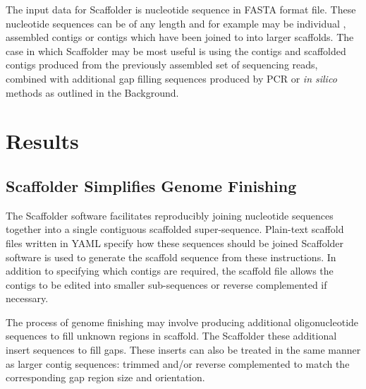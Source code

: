 \documentclass[10pt]{bmc_article}
\newenvironment{bmcformat}{\begin{raggedright}\baselineskip20pt\sloppy\setboolean{publ}{false}}{\end{raggedright}\baselineskip20pt\sloppy}
\begin{document}
\begin{bmcformat}
The input data for Scaffolder is nucleotide sequence in FASTA format file.
These nucleotide sequences can be of any length and for example may be
individual , assembled contigs or contigs which have
been joined to into larger scaffolds. The case in which Scaffolder may be most
useful is using the contigs and scaffolded contigs produced from the
previously assembled set of sequencing reads, combined with additional gap
filling sequences produced by PCR or \emph{in silico} methods as outlined in
the Background. \pb


\clearpage

\section*{Results} %

\subsection*{Scaffolder Simplifies Genome Finishing} %

The Scaffolder software facilitates reproducibly joining nucleotide sequences
together into a single contiguous scaffolded super-sequence. Plain-text
scaffold files written in  YAML  specify how these
sequences should be joined Scaffolder software is used
to generate the scaffold sequence from these instructions. In addition to
specifying which contigs are required, the scaffold file allows the contigs to
be edited into smaller sub-sequences or reverse complemented if necessary.
 \pb

The process of genome finishing may involve producing additional
oligonucleotide sequences to fill unknown regions in  scaffold.
 The Scaffolder  these additional insert sequences  to fill 
gaps. These inserts can also be treated in the same manner as larger contig
sequences: trimmed and/or reverse complemented to match the corresponding gap
region size and orientation. \pb


\end{bmcformat}
\end{document}
